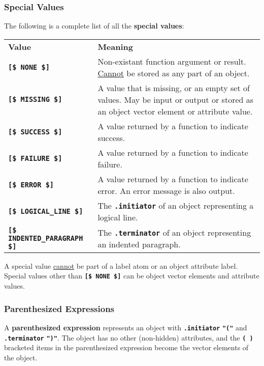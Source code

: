 \documentclass[12pt]{article}
\newcommand{\TT}[1]{{\tt \bfseries #1}}
\newcommand{\key}[1]{{\rm \bfseries #1}}
\begin{document}
\subsubsection{Special Values}
\label{SPECIAL-VALUES}

The following is a complete list of all the \key{special values}:

\begin{center}
\begin{tabular}{lp{3.5in}}
\bf Value & \bf Meaning
\\[1ex]
\TT{[\$ NONE \$]} & Non-existant function argument or result.
		    \underline{Cannot} be stored as any part of
		    an object.
\\[0.5ex]
\TT{[\$ MISSING \$]} & A value that is missing, or an empty set of values.
                       May be input or output or stored as an object
		       vector element or attribute value.
\\[0.5ex]
\TT{[\$ SUCCESS \$]} & A value returned by a function to indicate success.
\\[0.5ex]
\TT{[\$ FAILURE \$]} & A value returned by a function to indicate failure.
\\[0.5ex]
\TT{[\$ ERROR \$]} & A value returned by a function to indicate error.
                     An error message is also output.
\\[0.5ex]
\TT{[\$ LOGICAL\_LINE \$]} & The \TT{.initiator} of an object representing a
                             logical line.
\\[0.5ex]
\TT{[\$ INDENTED\_PARAGRAPH \$]} & The \TT{.terminator} of an object
                                   representing an indented paragraph.
\end{tabular}
\end{center}

A special value \underline{cannot} be part of a label atom or an object
attribute label.  Special values other than \TT{[\$ NONE \$]}
can be object vector elements and attribute values.

\subsubsection{Parenthesized Expressions}
\label{PARENTHESIZED-EXPRESSIONS}

A \key{parenthesized expression} represents an object with
\TT{.initiator} \TT{"("} and \TT{.terminator} \TT{")"}.
The object has no other (non-hidden) attributes, and the
\TT{(~)} bracketed items in the parenthesized expression
become the vector elements of the object.
\end{document}
